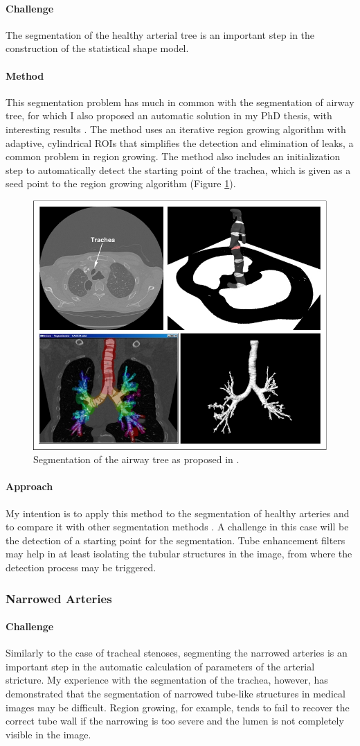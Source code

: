 \documentclass[a4paper]{article}
\newcommand{\challenge}{\paragraph{Challenge}}
\newcommand{\method}{\paragraph{Method}}
\newcommand{\approach}{\paragraph{Approach}}
\begin{document}
\challenge

The segmentation of the healthy arterial tree is an important step in the construction of the statistical shape model. 

\method
This segmentation problem has much in common with the segmentation of airway tree, for which I also proposed an automatic solution in my PhD thesis, with interesting results \citep{Pinho:Airways2}. The method uses an iterative region growing algorithm with adaptive, cylindrical ROIs that simplifies the detection and elimination of leaks, a common problem in region growing. The method also includes an initialization step to automatically detect the starting point of the trachea, which is given as a seed point to the region growing algorithm (Figure \ref{fig:airways}). 

\begin{figure}%
\centering
\includegraphics[width=0.5\columnwidth]{research_interests_airways.jpg}%
\caption{Segmentation of the airway tree as proposed in \citep{Pinho:Airways2}.}%
\label{fig:airways}%
\end{figure}

\approach

My intention is to apply this method to the segmentation of healthy arteries and to compare it with other segmentation methods \citep{Florez2, Antiga}. A challenge in this case will be the detection of a starting point for the segmentation. Tube enhancement filters \citep{ORLO-09} may help in at least isolating the tubular structures in the image, from where  the detection process may be triggered. 

\subsubsection{Narrowed Arteries}
\label{sec:narrowedarteries}

\challenge
Similarly to the case of tracheal stenoses, segmenting the narrowed arteries is an important step in the automatic calculation of parameters of the arterial stricture. My experience with the segmentation of the trachea, however, has demonstrated that the segmentation of narrowed tube-like structures in medical images may be difficult. Region growing, for example, tends to fail to recover the correct tube wall if the narrowing is too severe and the lumen is not completely visible in the image. 
\end{document}
